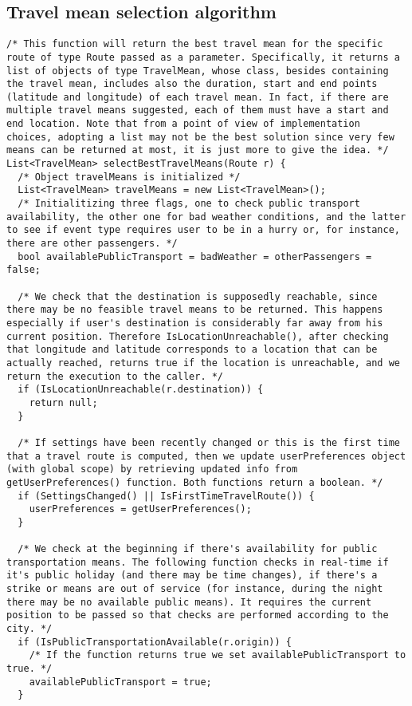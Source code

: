 \subsection*{Travel mean selection algorithm}
\begin{tcolorbox}
\begin{verbatim}
/* This function will return the best travel mean for the specific route of type Route passed as a parameter. Specifically, it returns a list of objects of type TravelMean, whose class, besides containing the travel mean, includes also the duration, start and end points (latitude and longitude) of each travel mean. In fact, if there are multiple travel means suggested, each of them must have a start and end location. Note that from a point of view of implementation choices, adopting a list may not be the best solution since very few means can be returned at most, it is just more to give the idea. */ 
List<TravelMean> selectBestTravelMeans(Route r) {
  /* Object travelMeans is initialized */
  List<TravelMean> travelMeans = new List<TravelMean>();
  /* Initialitizing three flags, one to check public transport availability, the other one for bad weather conditions, and the latter to see if event type requires user to be in a hurry or, for instance, there are other passengers. */
  bool availablePublicTransport = badWeather = otherPassengers = false;

  /* We check that the destination is supposedly reachable, since there may be no feasible travel means to be returned. This happens especially if user's destination is considerably far away from his current position. Therefore IsLocationUnreachable(), after checking that longitude and latitude corresponds to a location that can be actually reached, returns true if the location is unreachable, and we return the execution to the caller. */
  if (IsLocationUnreachable(r.destination)) {
    return null;
  }
  
  /* If settings have been recently changed or this is the first time that a travel route is computed, then we update userPreferences object (with global scope) by retrieving updated info from getUserPreferences() function. Both functions return a boolean. */
  if (SettingsChanged() || IsFirstTimeTravelRoute()) {
    userPreferences = getUserPreferences();
  }

  /* We check at the beginning if there's availability for public transportation means. The following function checks in real-time if it's public holiday (and there may be time changes), if there's a strike or means are out of service (for instance, during the night there may be no available public means). It requires the current position to be passed so that checks are performed according to the city. */
  if (IsPublicTransportationAvailable(r.origin)) {
    /* If the function returns true we set availablePublicTransport to true. */
    availablePublicTransport = true;
  }
  

\end{verbatim}
\end{tcolorbox}
